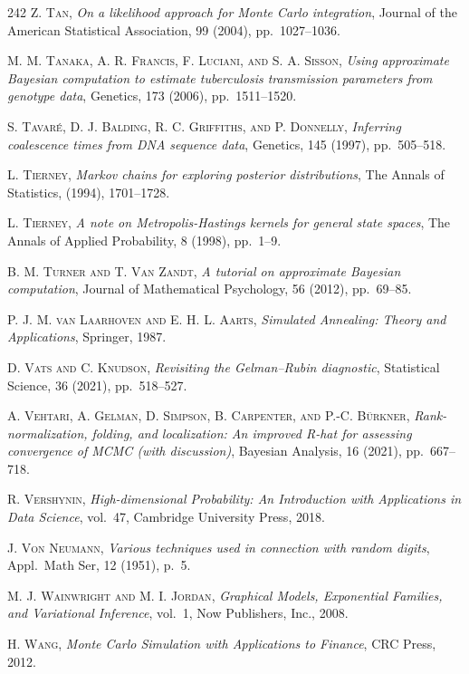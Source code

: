 \begin{thebibliography}{242}
\textsc{Z. Tan},
\textit{On a likelihood approach for Monte Carlo integration},
Journal of the American Statistical Association, 99 (2004), pp.\ 1027--1036.

\textsc{M. M. Tanaka, A. R. Francis, F. Luciani, and S. A. Sisson},
\textit{Using approximate Bayesian computation to estimate tuberculosis transmission parameters from genotype data},
Genetics, 173 (2006), pp.\ 1511--1520.

\textsc{S. Tavar\'e, D. J. Balding, R. C. Griffiths, and P. Donnelly},
\textit{Inferring coalescence times from DNA sequence data},
Genetics, 145 (1997), pp.\ 505--518.

\textsc{L. Tierney},
\textit{Markov chains for exploring posterior distributions},
The Annals of Statistics, (1994), 1701--1728.

\textsc{L. Tierney},
\textit{A note on Metropolis-Hastings kernels for general state spaces},
The Annals of Applied Probability, 8 (1998), pp.\ 1--9.

\textsc{B. M. Turner and T. Van Zandt},
\textit{A tutorial on approximate Bayesian computation},
Journal of Mathematical Psychology, 56 (2012), pp.\ 69--85.

\textsc{P. J. M. van Laarhoven and E. H. L. Aarts},
\textit{Simulated Annealing: Theory and Applications},
Springer, 1987.

\textsc{D. Vats and C. Knudson},
\textit{Revisiting the Gelman--Rubin diagnostic},
Statistical Science, 36 (2021), pp.\ 518--527.

\textsc{A. Vehtari, A. Gelman, D. Simpson, B. Carpenter, and P.-C. B\"urkner},
\textit{Rank-normalization, folding, and localization: An improved R-hat for assessing convergence of MCMC (with discussion)},
Bayesian Analysis, 16 (2021), pp.\ 667--718.

\textsc{R. Vershynin},
\textit{High-dimensional Probability: An Introduction with Applications in Data Science},
vol.\ 47, Cambridge University Press, 2018.

\textsc{J. Von Neumann},
\textit{Various techniques used in connection with random digits},
Appl.\ Math Ser, 12 (1951), p.\ 5.

\textsc{M. J. Wainwright and M. I. Jordan},
\textit{Graphical Models, Exponential Families, and Variational Inference},
vol.\ 1, Now Publishers, Inc., 2008.

\textsc{H. Wang},
\textit{Monte Carlo Simulation with Applications to Finance},
CRC Press, 2012.


\end{thebibliography}
